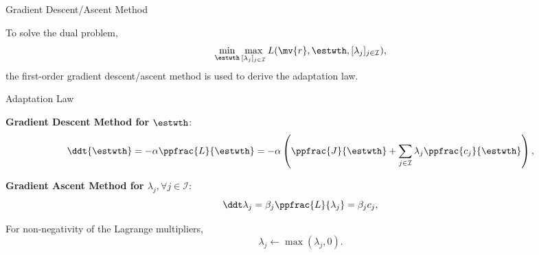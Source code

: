 \documentclass[8pt, aspectratio=169, handout]{beamer}
\begin{document}
\begin{frame}{\insertsubsectionhead}{Gradient Descent/Ascent Method}
  
  To solve the dual problem, 
  \begin{equation}
    \min_{\estwth}\max_{[\lambda_j]_{j\in\mathcal{I}}} 
    L(\mv{r},\estwth,[\lambda_j]_{j\in\mathcal{I}})
    ,
  \end{equation}
  the first-order gradient descent/ascent method is used to derive the adaptation law.

  \centering
  \begin{minipage}{0.6\textwidth}%

    \begin{block}{Adaptation Law}%
      
    \textbf{Gradient Descent Method for $\estwth$}:
    \begin{equation}\label{eq:adaptation_law:1}
      \ddt {{\estwth}}
      =
      -\alpha 
      \ppfrac{L}{{\estwth}}
      =-\alpha 
      \left(
          \ppfrac{J}{{\estwth}}
          +
          \sum_{j\in\mathcal{I}}
          \lambda_j 
          \ppfrac{c_j}{\estwth}
      \right),
    \end{equation}

    \textbf{Gradient Ascent Method for $\lambda_j, \forall j\in\mathcal I$}:
    \begin{equation}\label{eq:adaptation_law:2}
      \ddt\lambda_j
      = 
      \beta_j
      \ppfrac{L}{\lambda_j} 
      = 
      \beta_j c_j ,
    \end{equation}

    For non-negativity of the Lagrange multipliers,
    \begin{equation}\label{eq:adaptation_law:3}
      \lambda_j
      \leftarrow
      \max(\lambda_j,0)
      .
    \end{equation}


    \end{block}
  \end{minipage}
\end{frame}
\end{document}
